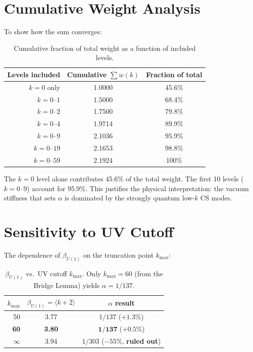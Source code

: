 \documentclass[12pt,a4paper]{article}
\begin{document}
\section{Cumulative Weight Analysis}
\label{sec:cumulative}

To show how the sum converges:

\begin{table}[h]
\centering
\caption{Cumulative fraction of total weight as a function of
included levels.}
\label{tab:cumulative}
\begin{tabular}{rcc}
\toprule
Levels included & Cumulative $\sum w(k)$ & Fraction of total \\
\midrule
$k = 0$ only     & 1.0000 & 45.6\% \\
$k = 0$--$1$     & 1.5000 & 68.4\% \\
$k = 0$--$2$     & 1.7500 & 79.8\% \\
$k = 0$--$4$     & 1.9714 & 89.9\% \\
$k = 0$--$9$     & 2.1036 & 95.9\% \\
$k = 0$--$19$    & 2.1653 & 98.8\% \\
$k = 0$--$59$    & 2.1924 & 100\% \\
\bottomrule
\end{tabular}
\end{table}

The $k = 0$ level alone contributes 45.6\% of the total weight.
The first 10 levels ($k = 0$--$9$) account for 95.9\%.  This
justifies the physical interpretation: the vacuum stiffness that
sets $\alpha$ is dominated by the strongly quantum low-$k$ CS
modes.

\section{Sensitivity to UV Cutoff}
\label{sec:sensitivity}

The dependence of $\beta_{U(1)}$ on the truncation point $k_{\max}$:

\begin{table}[h]
\centering
\caption{$\beta_{U(1)}$ vs.\ UV cutoff $k_{\max}$.  Only
$k_{\max} = 60$ (from the Bridge Lemma) yields $\alpha = 1/137$.}
\label{tab:kmax-scan}
\begin{tabular}{rcc}
\toprule
$k_{\max}$ & $\beta_{U(1)} = \langle k{+}2 \rangle$ & $\alpha$ result \\
\midrule
50 & 3.77 & $1/137$ ($+1.3\%$) \\
\textbf{60} & \textbf{3.80} & $\mathbf{1/137}$ ($\mathbf{+0.5\%}$) \\
$\infty$ & 3.94 & $1/303$ ($-55\%$, \textbf{ruled out}) \\
\bottomrule
\end{tabular}
\end{table}
\end{document}
